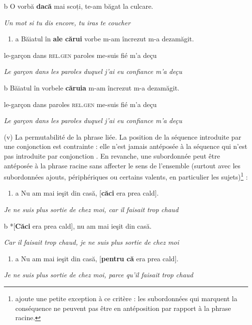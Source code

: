   b  O vorbă \textbf{dacă} mai scoți, te-am băgat la culcare.

    \textit{Un mot si tu dis encore, tu iras te coucher}


\begin{enumerate}
\item \label{bkm:Ref300186401}a  Băiatul  în  \textbf{ale cărui}  vorbe  m-am  încrezut  m-a  dezamăgit.


\end{enumerate}
le-garçon  dans  \textsc{rel.gen}  paroles  me-suis  fié  m'a  deçu

{\itshape
Le garçon dans les paroles duquel j'ai eu confiance m'a deçu}

  b  Băiatul  în  vorbele  \textbf{căruia}  m-am  încrezut  m-a  dezamăgit.

 le-garçon  dans  paroles  \textsc{rel.gen}  me-suis  fié  m'a  deçu

  \textit{Le garçon dans les paroles duquel j'ai eu confiance m'a deçu}

(v) La permutabilité de la phrase liée. La position de la séquence introduite par une conjonction est contrainte : elle n'est jamais antéposée à la séquence qui n'est pas introduite par conjonction . En revanche, une subordonnée peut être antéposée à la phrase racine  sans affecter le sens de l'ensemble (surtout avec les subordonnées ajouts, périphériques ou certains valents, en particulier les sujets)\footnote{\citet{Piot1993} ajoute une petite exception à ce critère : les subordonnées qui marquent la conséquence ne peuvent pas être en antéposition par rapport à la phrase racine.} : 


\begin{enumerate}
\item \label{bkm:Ref300186642}a  Nu am mai ieşit din casă, [\textbf{căci} era prea cald].


\end{enumerate}
{\itshape
Je ne suis plus sortie de chez moi, car il faisait trop chaud}

  b  *[\textbf{Căci} era prea cald], nu am mai ieşit din casă.

{\itshape
Car il faisait trop chaud, je ne suis plus sortie de chez moi}


\begin{enumerate}
\item \label{bkm:Ref300186661}a  Nu am mai ieşit din casă, [\textbf{pentru că} era prea cald].


\end{enumerate}
{\itshape
Je ne suis plus sortie de chez moi, parce qu'il faisait trop chaud}

